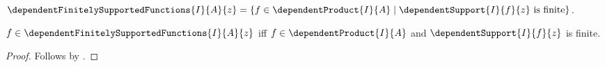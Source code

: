 \begin{definition}\label{spike_dependent_finitely_supported_functions}
    $\dependentFinitelySupportedFunctions{I}{A}{z}
        =\{f\in\dependentProduct{I}{A}\mid
            \text{$\dependentSupport{I}{f}{z}$ is finite}\}$.
\end{definition}

\begin{proposition}\label{spike_dependent_finitely_supported_functions_iff}
    $f\in\dependentFinitelySupportedFunctions{I}{A}{z}$ iff
        $f\in\dependentProduct{I}{A}$ and
        $\dependentSupport{I}{f}{z}$ is finite.
\end{proposition}
\begin{proof}
    Follows by
        .
\end{proof}

